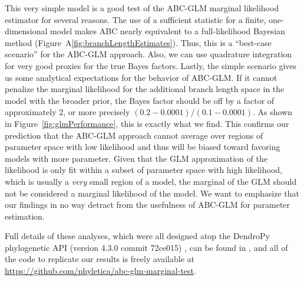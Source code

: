 This very simple model is a good test of the ABC-GLM marginal likelihood
estimator for several reasons.
The use of a sufficient statistic for a finite, one-dimensional model makes ABC
nearly equivalent to a full-likelihood Bayesian method
(Figure~A\ref{fig:branchLengthEstimates}).
Thus, this is a ``best-case scenario'' for the ABC-GLM approach.
Also, we can use quadrature integration for very good proxies for the true
Bayes factors.
Lastly, the simple scenario gives us some analytical expectations for the
behavior of ABC-GLM.
If it cannot penalize the marginal likelihood for the additional branch length
space in the model with the broader prior, the Bayes factor should be off by a
factor of approximately 2, or more precisely $(0.2-0.0001) / (0.1-0.0001)$.
As shown in Figure~\ref{fig:glmPerformance}, this is exactly what we find.
This confirms our prediction that the ABC-GLM approach cannot average over
regions of parameter space with low likelihood and thus will be biased toward
favoring models with more parameter.
Given that the GLM approximation of the likelihood is only fit within a subset
of parameter space with high likelihood, which is usually a \emph{very} small
region of a model, the marginal of the GLM should not be considered a marginal
likelihood of the model.
We want to emphasize that our findings in no way detract from the usefulness of
ABC-GLM for parameter estimation.

Full details of these analyses, which were all designed atop the DendroPy
phylogenetic API (version 4.3.0 commit 72ce015) \citep{Sukumaran2010}, can be
found in
,
and all of the code to replicate our
results is freely available at
\href{https://github.com/phyletica/abc-glm-marginal-test}{https://github.com/phyletica/abc-glm-marginal-test}.




